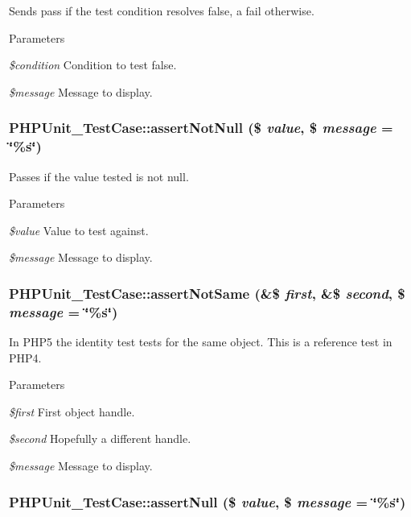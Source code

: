 Sends pass if the test condition resolves false, a fail otherwise. 
\begin{DoxyParams}{Parameters}
\item[{\em \$condition}]Condition to test false. \item[{\em \$message}]Message to display. \end{DoxyParams}
\hypertarget{class_p_h_p_unit___test_case_a9b906d5a1b0f27570f1c396e2a5a99e9}{
\subsubsection[{assertNotNull}]{\setlength{\rightskip}{0pt plus 5cm}PHPUnit\_\-TestCase::assertNotNull (\$ {\em value}, \/  \$ {\em message} = {\ttfamily \char`\"{}\%s\char`\"{}})}}
\label{class_p_h_p_unit___test_case_a9b906d5a1b0f27570f1c396e2a5a99e9}
Passes if the value tested is not null. 
\begin{DoxyParams}{Parameters}
\item[{\em \$value}]Value to test against. \item[{\em \$message}]Message to display. \end{DoxyParams}
\hypertarget{class_p_h_p_unit___test_case_ad616a8e124f71e003fdee1c484a5910f}{
\subsubsection[{assertNotSame}]{\setlength{\rightskip}{0pt plus 5cm}PHPUnit\_\-TestCase::assertNotSame (\&\$ {\em first}, \/  \&\$ {\em second}, \/  \$ {\em message} = {\ttfamily \char`\"{}\%s\char`\"{}})}}
\label{class_p_h_p_unit___test_case_ad616a8e124f71e003fdee1c484a5910f}
In PHP5 the identity test tests for the same object. This is a reference test in PHP4. 
\begin{DoxyParams}{Parameters}
\item[{\em \$first}]First object handle. \item[{\em \$second}]Hopefully a different handle. \item[{\em \$message}]Message to display. \end{DoxyParams}
\hypertarget{class_p_h_p_unit___test_case_ad8562d55d3341b088a6d90d38c1024e9}{
\subsubsection[{assertNull}]{\setlength{\rightskip}{0pt plus 5cm}PHPUnit\_\-TestCase::assertNull (\$ {\em value}, \/  \$ {\em message} = {\ttfamily \char`\"{}\%s\char`\"{}})}}
